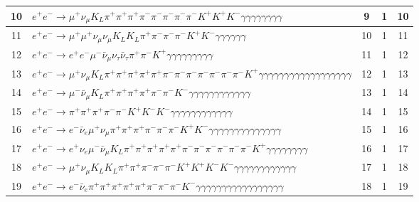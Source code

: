 \documentclass[landscape]{article}
\begin{document}
\begin{table}[htbp!]
\begin{tabular}{|c|>{\centering}p{18cm}|c|c|c|}
\hline
10 & $ e^{+} e^{-} \rightarrow \mu^{+} \nu_{\mu} K_{L} \pi^{+} \pi^{+} \pi^{+} \pi^{-} \pi^{-} \pi^{-} \pi^{-} \pi^{-} K^{+} K^{+} K^{-} \gamma \gamma \gamma \gamma \gamma \gamma \gamma \gamma $ & 9 & 1 & 10 \\
\hline
11 & $ e^{+} e^{-} \rightarrow \mu^{+} \mu^{+} \nu_{\mu} \nu_{\mu} K_{L} K_{L} \pi^{+} \pi^{-} \pi^{-} \pi^{-} K^{+} K^{-} \gamma \gamma \gamma \gamma \gamma \gamma $ & 10 & 1 & 11 \\
\hline
12 & $ e^{+} e^{-} \rightarrow e^{+} e^{-} \mu^{-} \bar{\nu}_{\mu} \nu_{\tau} \bar{\nu}_{\tau} \pi^{+} \pi^{-} K^{+} \gamma \gamma \gamma \gamma \gamma \gamma \gamma \gamma \gamma $ & 11 & 1 & 12 \\
\hline
13 & $ e^{+} e^{-} \rightarrow \mu^{+} \nu_{\mu} K_{L} \pi^{+} \pi^{+} \pi^{+} \pi^{+} \pi^{+} \pi^{-} \pi^{-} \pi^{-} \pi^{-} \pi^{-} \pi^{-} \pi^{-} K^{+} \gamma \gamma \gamma \gamma \gamma \gamma \gamma \gamma \gamma \gamma \gamma \gamma \gamma \gamma \gamma \gamma \gamma \gamma $ & 12 & 1 & 13 \\
\hline
14 & $ e^{+} e^{-} \rightarrow \mu^{-} \bar{\nu}_{\mu} K_{L} \pi^{+} \pi^{+} \pi^{+} \pi^{+} \pi^{-} \pi^{-} K^{-} \gamma \gamma \gamma \gamma \gamma \gamma \gamma \gamma \gamma \gamma \gamma \gamma $ & 13 & 1 & 14 \\
\hline
15 & $ e^{+} e^{-} \rightarrow \pi^{+} \pi^{+} \pi^{+} \pi^{-} \pi^{-} K^{+} K^{-} K^{-} \gamma \gamma \gamma \gamma \gamma \gamma \gamma \gamma \gamma \gamma \gamma \gamma $ & 14 & 1 & 15 \\
\hline
16 & $ e^{+} e^{-} \rightarrow e^{-} \bar{\nu}_{e} \mu^{+} \nu_{\mu} \pi^{+} \pi^{+} \pi^{+} \pi^{-} \pi^{-} \pi^{-} K^{+} K^{-} \gamma \gamma \gamma \gamma \gamma \gamma \gamma \gamma \gamma \gamma \gamma \gamma \gamma \gamma $ & 15 & 1 & 16 \\
\hline
17 & $ e^{+} e^{-} \rightarrow e^{+} \nu_{e} \mu^{-} \bar{\nu}_{\mu} K_{L} \pi^{+} \pi^{+} \pi^{+} \pi^{+} \pi^{+} \pi^{-} \pi^{-} \pi^{-} \pi^{-} \pi^{-} \pi^{-} K^{+} \gamma \gamma \gamma \gamma \gamma \gamma \gamma \gamma $ & 16 & 1 & 17 \\
\hline
18 & $ e^{+} e^{-} \rightarrow \mu^{+} \nu_{\mu} K_{L} K_{L} \pi^{+} \pi^{+} \pi^{-} \pi^{-} \pi^{-} K^{+} K^{+} K^{-} K^{-} \gamma \gamma \gamma \gamma \gamma \gamma \gamma \gamma \gamma \gamma \gamma \gamma $ & 17 & 1 & 18 \\
\hline
19 & $ e^{+} e^{-} \rightarrow e^{-} \bar{\nu}_{e} \pi^{+} \pi^{+} \pi^{+} \pi^{+} \pi^{+} \pi^{-} \pi^{-} \pi^{-} K^{-} \gamma \gamma \gamma \gamma \gamma \gamma \gamma \gamma \gamma \gamma \gamma \gamma \gamma \gamma \gamma \gamma \gamma $ & 18 & 1 & 19 \\

\end{tabular}
\end{table}
\end{document}
